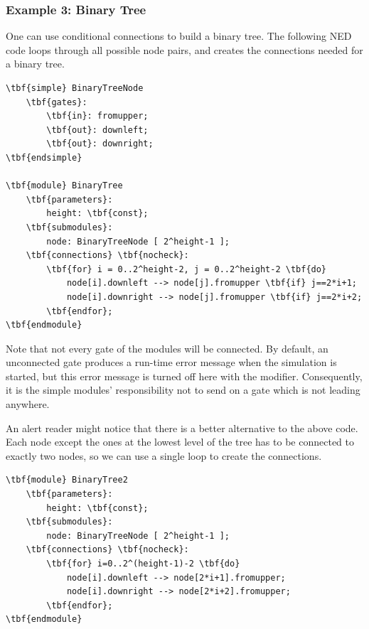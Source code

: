 \subsubsection{Example 3: Binary Tree}


One can use conditional connections to build a binary tree.
The following NED code loops through all possible node pairs, and
creates the connections needed for a binary tree.

\begin{Verbatim}[commandchars=\\\{\}]
\tbf{simple} BinaryTreeNode
    \tbf{gates}:
        \tbf{in}: fromupper;
        \tbf{out}: downleft;
        \tbf{out}: downright;
\tbf{endsimple}

\tbf{module} BinaryTree
    \tbf{parameters}:
        height: \tbf{const};
    \tbf{submodules}:
        node: BinaryTreeNode [ 2^height-1 ];
    \tbf{connections} \tbf{nocheck}:
        \tbf{for} i = 0..2^height-2, j = 0..2^height-2 \tbf{do}
            node[i].downleft --> node[j].fromupper \tbf{if} j==2*i+1;
            node[i].downright --> node[j].fromupper \tbf{if} j==2*i+2;
        \tbf{endfor};
\tbf{endmodule}
\end{Verbatim}

Note that not every gate of the modules will be connected. By default,
an unconnected gate produces a run-time error message when the
simulation is started, but this error message is turned off here with
the  modifier.  Consequently, it
is the simple modules' responsibility not to send on a gate which is
not leading anywhere.

An alert reader might notice that there is a better alternative
to the above code. Each node except the ones at the lowest level
of the tree has to be connected to exactly two nodes,
so we can use a single loop to create the connections.

\begin{Verbatim}[commandchars=\\\{\}]
\tbf{module} BinaryTree2
    \tbf{parameters}:
        height: \tbf{const};
    \tbf{submodules}:
        node: BinaryTreeNode [ 2^height-1 ];
    \tbf{connections} \tbf{nocheck}:
        \tbf{for} i=0..2^(height-1)-2 \tbf{do}
            node[i].downleft --> node[2*i+1].fromupper;
            node[i].downright --> node[2*i+2].fromupper;
        \tbf{endfor};
\tbf{endmodule}
\end{Verbatim}



